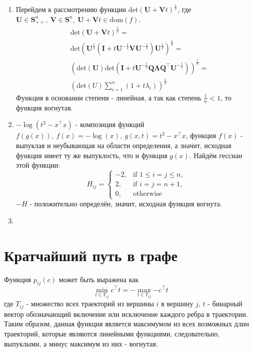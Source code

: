 \documentclass{article}
\begin{document}
\begin{enumerate}
    \item Перейдем к рассмотрению функции $\mathrm{det}(\mathbf{U} + \mathbf{V}t)^{\frac{1}{n}}$, где $\mathbf{U} \in \mathbf{S}_{++}^n, \ \mathbf{V} \in \mathbf{S}^n, \ \mathbf{U} + \mathbf{V}t \in \mathrm{dom}(f)$.
          \begin{align*}
               & \mathrm{det}(\mathbf{U} + \mathbf{V}t)^{\frac{1}{n}} =                                                                                                             \\
               & \mathrm{det}(\mathbf{U}^{\frac{1}{2}}(\mathbf{I} + t\mathbf{U}^{-\frac{1}{2}}\mathbf{V}\mathbf{U}^{-\frac{1}{2}})\mathbf{U}^{\frac{1}{2}})^{\frac{1}{n}} =         \\
               & (\mathrm{det}(\mathbf{U}) \mathrm{det}(\mathbf{I} + t\mathbf{U}^{-\frac{1}{2}}\mathbf{Q}\mathbf{\Lambda}\mathbf{Q}^\top\mathbf{U}^{-\frac{1}{2}}))^{\frac{1}{n}} = \\
               & (\mathrm{det}(U) \sum_{i=1}^n{(1 + t\lambda_i)})^\frac{1}{n}
          \end{align*}
          Функция в основании степени - линейная, а так как степень $\frac{1}{n} < 1$, то функция вогнутая.

    \item
          $-\log(t^2 - x^\top x)$ - композиция функций $f(g(x)), \ f(x) = -\log(x), \ g(x, t) = t^2 - x^\top x$, функция $f(x)$ - выпуклая и неубывающая на области определения, а значит, исходная функция имеет ту же выпуклость, что и функция $g(x)$.
          Найдём гессиан этой функции:
          $$
              H_{ij} =
              \begin{cases}
                  -2, & \text{if } 1 \leq i = j \leq n, \\
                  2,  & \text{if } i = j = n+1,         \\
                  0,  & \text{otherwise}
              \end{cases}
          $$
          $-H$ - положительно определён, значит, исходная функция вогнута.

    \item

\end{enumerate}
\section{Кратчайший путь в графе}
Функция $p_{ij}(c)$ может быть выражена как
$$
    \min_{t \in T_{ij}}{c^\top t} = -\max_{t \in T_{ij}}{-c^\top t}
$$
где $T_{ij}$ - множество всех траекторий из вершины $i$ в вершину $j$, $t$ - бинарный вектор обозначающий включение или исключение каждого ребра в траектории. Таким образом, данная функция является максимумом из всех возможных длин траекторий, которые являются линейными функциями, следовательно, выпуклыми, а минус максимум из них - вогнутая.
\end{document}
